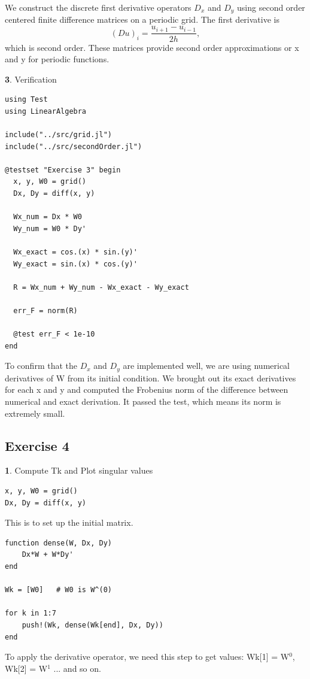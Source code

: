 \documentclass[11pt]{article}
\begin{document}
We construct the discrete first derivative operators $D_x$ and $D_y$ using second order centered finite difference matrices on a periodic grid. 
The first derivative is
\[
(Du)_i = \frac{u_{i+1} - u_{i-1}}{2h},
\]
which is second order. These matrices provide second order approximations or x and y for periodic functions.

\textbf{3}. Verification

\begin{lstlisting}
using Test
using LinearAlgebra

include("../src/grid.jl")
include("../src/secondOrder.jl")

@testset "Exercise 3" begin
  x, y, W0 = grid()
  Dx, Dy = diff(x, y)

  Wx_num = Dx * W0
  Wy_num = W0 * Dy'

  Wx_exact = cos.(x) * sin.(y)'
  Wy_exact = sin.(x) * cos.(y)'

  R = Wx_num + Wy_num - Wx_exact - Wy_exact

  err_F = norm(R)

  @test err_F < 1e-10
end
\end{lstlisting}

To confirm that the $D_x$ and $D_y$ are implemented well, we are using numerical derivatives of W from its initial condition. We brought out its exact derivatives for each x and y and computed the Frobenius norm of the difference between numerical and exact derivation. It passed the test, which means its norm is extremely small. 

\subsection*{Exercise 4}
\textbf{1}. Compute Tk and Plot singular values

\begin{lstlisting}
x, y, W0 = grid()
Dx, Dy = diff(x, y)
\end{lstlisting}
This is to set up the initial matrix. 
\begin{lstlisting}
function dense(W, Dx, Dy)
    Dx*W + W*Dy'
end

Wk = [W0]   # W0 is W^(0)

for k in 1:7
    push!(Wk, dense(Wk[end], Dx, Dy))
end
\end{lstlisting}

To apply the derivative operator, we need this step to get values:
Wk[1] = W$^{0}$, Wk[2] = W$^{1}$ ... and so on. 
\end{document}
